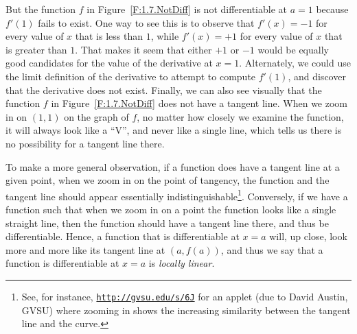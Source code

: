 But the function $f$ in Figure~\ref{F:1.7.NotDiff} is not differentiable at $a = 1$ because $f'(1)$ fails to exist.  One way to see this is to observe that $f'(x) = -1$ for every value of $x$ that is less than $1$, while $f'(x) = +1$ for every value of $x$ that is greater than $1$.  That makes it seem that either $+1$ or $-1$ would be equally good candidates for the value of the derivative at $x = 1$.   Alternately, we could use the limit definition of the derivative to attempt to compute $f'(1)$, and discover that the derivative does not exist.  Finally, we can also see visually that the function $f$ in Figure~\ref{F:1.7.NotDiff} does not have a tangent line.  When we zoom in on $(1,1)$ on the graph of $f$, no matter how closely we examine the function, it will always look like a ``V'', and never like a single line, which tells us there is no possibility for a tangent line there.  

To make a more general observation, if a function does have a tangent line at a given point, when we zoom in on the point of tangency, the function and the tangent line should appear essentially indistinguishable\footnote{See, for instance, \href{http://gvsu.edu/s/6J}{\texttt{http://gvsu.edu/s/6J}} for an applet (due to David Austin, GVSU) where zooming in shows the increasing similarity between the tangent line and the curve.  }.  Conversely, if we have a function such that when we zoom in on a point the function looks like a single straight line, then the function should have a tangent line there, and thus be differentiable.  Hence, a function that is differentiable at $x = a$ will, up close, look more and more like its tangent line at $(a,f(a))$, and thus we say that a function is differentiable at $x = a$ is \emph{locally linear}. 



